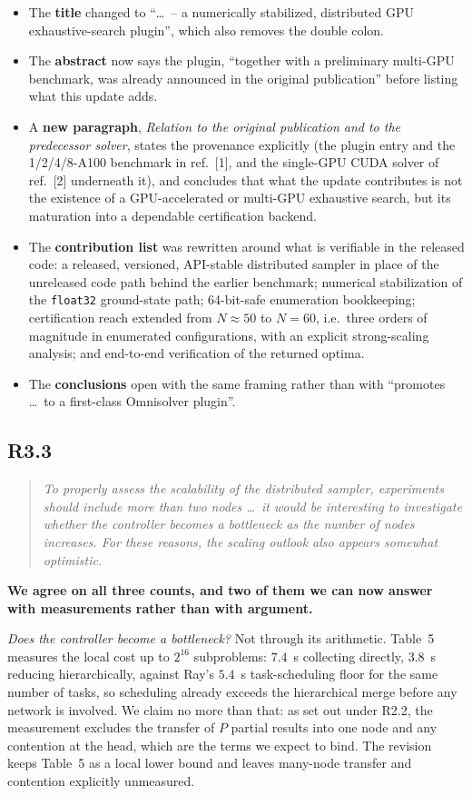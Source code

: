 \documentclass[11pt,a4paper]{article}
\newenvironment{reviewercomment}
  {\begin{quote}\itshape\small}
  {\end{quote}}
\newcommand{\point}[2]{%
  \subsection*{#1}%
  \begin{reviewercomment}#2\end{reviewercomment}}
\begin{document}
\begin{itemize}[leftmargin=*]
\item The \textbf{title} changed to ``\dots\ -- a numerically stabilized, distributed GPU
exhaustive-search plugin'', which also removes the double colon.
\item The \textbf{abstract} now says the plugin, ``together with a preliminary multi-GPU
benchmark, was already announced in the original publication'' before listing what this update
adds.
\item A \textbf{new paragraph}, \emph{Relation to the original publication and to the
predecessor solver}, states the provenance explicitly (the plugin entry and the
1/2/4/8-A100 benchmark in ref.~[1], and the single-GPU CUDA solver of ref.~[2] underneath it),
and concludes that what the update contributes is not the existence of a GPU-accelerated or
multi-GPU exhaustive search, but its maturation into a dependable certification backend.
\item The \textbf{contribution list} was rewritten around what is verifiable in the released
code: a released, versioned, API-stable distributed sampler in place of the unreleased code
path behind the earlier benchmark; numerical stabilization of the \texttt{float32}
ground-state path; 64-bit-safe enumeration bookkeeping; certification reach extended
from $N\approx50$ to $N=60$, i.e.\ three orders of magnitude in enumerated configurations, with
an explicit strong-scaling analysis; and end-to-end verification of the returned optima.
\item The \textbf{conclusions} open with the same framing rather than with ``promotes \dots\ to
a first-class Omnisolver plugin''.
\end{itemize}

\point{R3.3}{To properly assess the scalability of the distributed sampler, experiments should
include more than two nodes \dots\ it would be interesting to investigate whether the
controller becomes a bottleneck as the number of nodes increases. For these reasons, the
scaling outlook also appears somewhat optimistic.}

\textbf{We agree on all three counts, and two of them we can now answer with measurements
rather than with argument.}

\emph{Does the controller become a bottleneck?} Not through its arithmetic. Table~5 measures
the local cost up to $2^{16}$ subproblems: $7.4$~s collecting directly, $3.8$~s reducing
hierarchically, against Ray's $5.4$~s task-scheduling floor for the same number of tasks, so
scheduling already exceeds the hierarchical merge before any network is involved. We claim no
more than that: as set out under R2.2, the measurement excludes the transfer of $P$ partial
results into one node and any contention at the head, which are the terms we expect to bind.
The revision keeps Table~5 as a local lower bound and leaves many-node transfer and contention
explicitly unmeasured.
\end{document}
